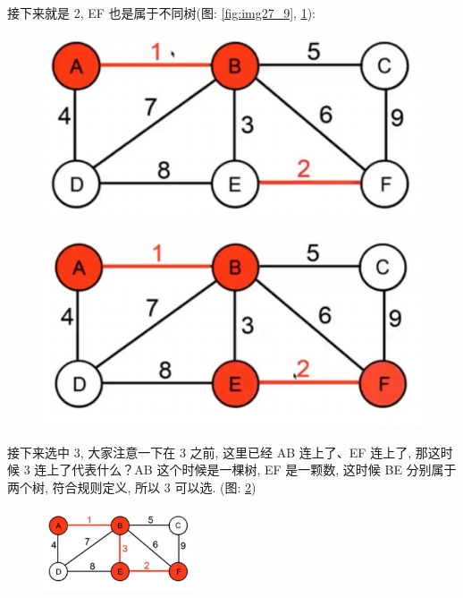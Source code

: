 接下来就是 2, EF 也是属于不同树(图: \ref{fig:img27_9}, \ref{fig:img27_10}): 

\begin{figure}[ht]
  \centering
  \begin{minipage}[t]{0.4\textwidth}
    \centering
    \caption{}
    \label{fig:img27_9}
    \includegraphics[width=\textwidth]{asset/2c867981-cf42-4372-b2de-0b95d4f1729a.jpg}
  \end{minipage}%
  \hspace{1em}
  \begin{minipage}[t]{0.4\textwidth}
    \centering
    \caption{}
    \label{fig:img27_10}
    \includegraphics[width=\textwidth]{asset/c2333fd2-d4a4-4d44-8381-9d0dd9588789.jpg}
  \end{minipage}
\end{figure}

接下来选中 3, 大家注意一下在 3 之前, 这里已经 AB 连上了、EF 连上了, 那这时候 3 连上了代表什么？AB 这个时候是一棵树, EF 是一颗数, 这时候 BE 分别属于两个树, 符合规则定义, 所以 3 可以选. (图: \ref{fig:img27_11})

\begin{figure}[ht]
  \centering
  \caption{}
  \label{fig:img27_11}
  \includegraphics[width=0.4\textwidth]{asset/c24feadf-69a2-46d0-af7e-dae86d8956ab.jpg}
\end{figure}

